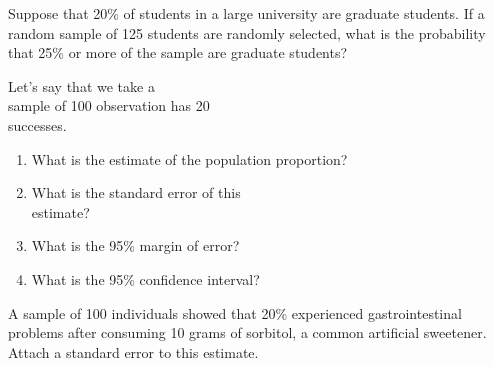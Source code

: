 \documentclass[11pt, chapterprefix=true]{scrbook}\usepackage[]{graphicx}\usepackage[]{color}
\begin{document}
\begin{exercises}
\begin{exercise} %

Suppose that 20\% of students in a large university are graduate students.  If a random sample of 125 students are randomly selected, what is the probability that 25\% or more of the sample are graduate students?
\end{exercise}

\begin{exercise} %

Let's say that we take a \\ sample of 100 observation has 20 \\ successes.

\begin{enumerate}
\item What is the estimate of the population proportion?
\item What is the standard error of this \\ estimate?
\item What is the 95\% margin of error?
\item What is the 95\% confidence interval?
\end{enumerate}

\end{exercise}
%

\begin{exercise} %

A sample of 100 individuals  showed that 20\% experienced gastrointestinal  problems  after consuming 10 grams of sorbitol, a common artificial sweetener. \\ Attach a standard error to this estimate.
\end{exercise}
\begin{solution} %



\end{solution}
\end{exercises}
\end{document}
